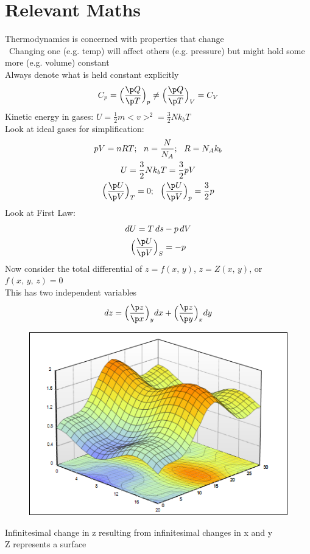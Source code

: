 \documentclass[a4paper, 11pt, normalem]{report}
\begin{document}
\section{Relevant Maths}
Thermodynamics is concerned with properties that change \\\
Changing one (e.g. temp) will affect others (e.g. pressure) but might hold some more (e.g. volume) constant \\
Always denote what is held constant explicitly
\begin{equation*}
    C_p = \Big(\frac{\p Q}{\p T}\Big)_p \neq \Big(\frac{\p Q}{\p T}\Big)_V = C_V
\end{equation*}
Kinetic energy in gases: $U = \frac{1}{2}m<v>^2 = \frac{3}{2}Nk_{b}T$ \\
Look at ideal gases for simplification:
\begin{gather*}
    pV = nRT;~~ n = \frac{N}{N_{A}};~~ R = N_{A}k_{b} \\
    U = \frac{3}{2}Nk_{b}T = \frac{3}{2}pV \\
    \Big(\frac{\p U}{\p V}\Big)_T = 0;~~ \Big(\frac{\p U}{\p V}\Big)_p = \frac{3}{2}p
\end{gather*}
Look at First Law:
\begin{gather*}
    dU = T\,ds - p\,dV \\
    \Big(\frac{\p U}{\p V}\Big)_S = -p
\end{gather*}
Now consider the total differential of $z = f(x,\,y)$, $z = Z(x,\,y)$, or $f(x,\,y,\,z) = 0$ \\
This has two independent variables
\begin{equation*}
    dz = \Big(\frac{\p z}{\p x}\Big)_y dx + \Big(\frac{\p z}{\p y}\Big)_x dy
\end{equation*}
\newpage
\begin{figure}
    \begin{center}
        \includegraphics[scale=0.35]{Surface.png}
    \end{center}
    \vspace{-80pt}
\end{figure}
Infinitesimal change in z resulting from infinitesimal changes in x and y \\
Z represents a surface
\end{document}
